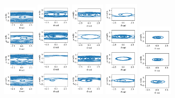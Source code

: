 \documentclass[11pt]{article} %
\begin{document}
    \begin{figure}[H]
        \centering
        \includegraphics[width=0.15\textwidth]{pcr_1.0_0.15.png}
        \includegraphics[width=0.15\textwidth]{pcr_1.0_0.3.png}
        \includegraphics[width=0.15\textwidth]{pcr_1.0_0.5.png}
        \includegraphics[width=0.15\textwidth]{pcr_1.0_1.0.png}
        \includegraphics[width=0.15\textwidth]{pcr_1.0_1.5.png}

\end{figure}
\end{document}
